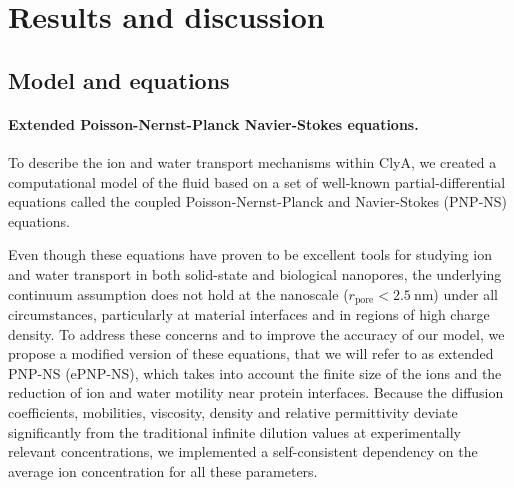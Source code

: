 \documentclass[journal=ancac3,manuscript=article,etalmode=truncate,maxauthors=0,layout=twocolumn]{achemso}
\begin{document}



\section{Results and discussion}\label{sect:results}

\subsection{Model and equations}



\paragraph{Extended Poisson-Nernst-Planck Navier-Stokes equations.}


To describe the ion and water transport mechanisms within ClyA, we created a computational model of the fluid
based on a set of well-known partial-differential equations called the coupled
Poisson-Nernst-Planck and Navier-Stokes (PNP-NS) equations.\cite{Eisenberg-1996,Cervera-2005,Lu-2012}

Even though these equations have proven to be excellent tools for studying ion and water transport in both
solid-state\cite{Daiguji-2004,Lu-2012,Chaudhry-2014,Rempfer-2016,Lin-2016} and biological
nanopores\cite{Eisenberg-1996,Simakov-2010,Pederson-2015}, the underlying continuum assumption does not hold
at the nanoscale ($r_{\text{pore}}<\SI{2.5}{\nm}$) under all circumstances, particularly at material
interfaces\cite{Vo-2016} and in regions of high charge density\cite{Corry-2000}. To address these concerns
and to improve the accuracy of our model, we propose a modified version of these equations, that we will
refer to as extended PNP-NS (ePNP-NS), which takes into account the finite size of the
ions\cite{Borukhov-1997,Lu-2011} and the reduction of ion and water motility near protein
interfaces.\cite{Makarov-1998, Pronk-2014} Because the diffusion coefficients\cite{Mills-1989},
mobilities\cite{Baldessari-2008-1}, viscosity\cite{Axelsson-2015,Hai-Lang-1996}, density\cite{Axelsson-2015,
Hai-Lang-1996} and relative permittivity\cite{Gavish-2016} deviate significantly from the traditional infinite dilution values at experimentally relevant concentrations, we implemented a self-consistent dependency on the average ion concentration for all these parameters.
\end{document}
